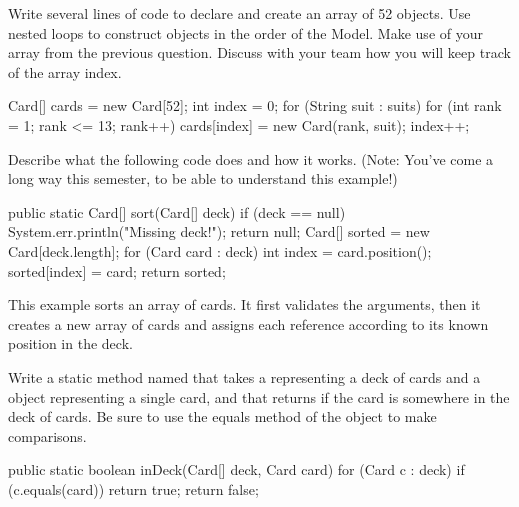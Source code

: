 \Q Write several lines of code to declare and create an array of 52  objects.
Use nested  loops to construct  objects in the order of the Model.
Make use of your  array from the previous question.
Discuss with your team how you will keep track of the array index.

\vspace*{-1ex}
\begin{answer}[10em]
\begin{javaans}
Card[] cards = new Card[52];
int index = 0;
for (String suit : suits) {
    for (int rank = 1; rank <= 13; rank++) {
        cards[index] = new Card(rank, suit);
        index++;
    }
}
\end{javaans}
\end{answer}


\Q Describe what the following code does and how it works. (Note: You've come a long way this semester, to be able to understand this example!)

\begin{javalst}
public static Card[] sort(Card[] deck) {
    if (deck == null) {
        System.err.println("Missing deck!");
        return null;
    }
    Card[] sorted = new Card[deck.length];
    for (Card card : deck) {
        int index = card.position();
        sorted[index] = card;
    }
    return sorted;
}
\end{javalst}

\begin{answer}
This example sorts an array of cards.
It first validates the arguments, then it creates a new array of cards and assigns each  reference according to its known position in the deck.
\end{answer}


\Q Write a static method named  that takes a  representing a deck of cards and a  object representing a single card, and that returns  if the card is somewhere in the deck of cards. Be sure to use the equals method of the  object to make comparisons.

\vspace{-1ex}
\begin{answer}[10em]
\begin{javaans}
public static boolean inDeck(Card[] deck, Card card) {
    for (Card c : deck) {
        if (c.equals(card)) {
            return true;
        }
    }
    return false;
}
\end{javaans}
\end{answer}
